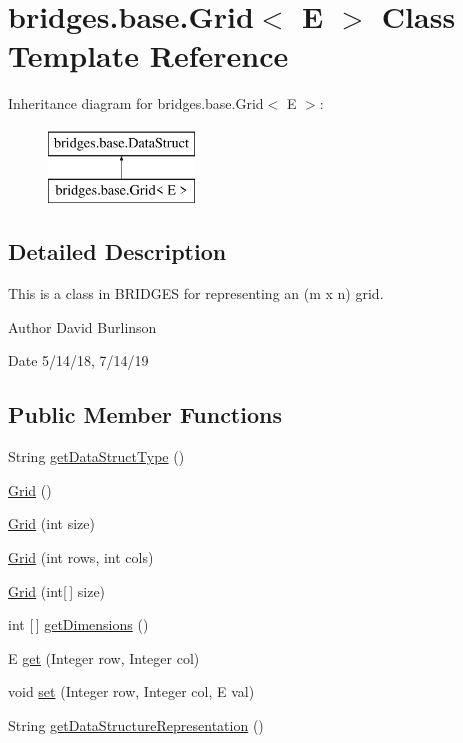\hypertarget{classbridges_1_1base_1_1_grid}{}\section{bridges.\+base.\+Grid$<$ E $>$ Class Template Reference}
\label{classbridges_1_1base_1_1_grid}
Inheritance diagram for bridges.\+base.\+Grid$<$ E $>$\+:\begin{figure}[H]
\begin{center}
\leavevmode
\includegraphics[height=2.000000cm]{classbridges_1_1base_1_1_grid}
\end{center}
\end{figure}


\subsection{Detailed Description}
This is a class in B\+R\+I\+D\+G\+ES for representing an (m x n) grid. 

\begin{DoxyAuthor}{Author}
David Burlinson 
\end{DoxyAuthor}
\begin{DoxyDate}{Date}
5/14/18, 7/14/19 
\end{DoxyDate}
\subsection*{Public Member Functions}
\begin{DoxyCompactItemize}
\item 
String \mbox{\hyperlink{classbridges_1_1base_1_1_grid_a81f268dd27c292ff2af9358039d4ebe6}{get\+Data\+Struct\+Type}} ()
\item 
\mbox{\hyperlink{classbridges_1_1base_1_1_grid_aa621ffc958db8341f7ce37ed78944d51}{Grid}} ()
\item 
\mbox{\hyperlink{classbridges_1_1base_1_1_grid_a9818d4959813f1292c6a234bc6f6aa9e}{Grid}} (int size)
\item 
\mbox{\hyperlink{classbridges_1_1base_1_1_grid_a43a699bd7ae2c6c986f978c515ff97d8}{Grid}} (int rows, int cols)
\item 
\mbox{\hyperlink{classbridges_1_1base_1_1_grid_ab9975b28d8dda7f3fbe0e35a7a026772}{Grid}} (int\mbox{[}$\,$\mbox{]} size)
\item 
int \mbox{[}$\,$\mbox{]} \mbox{\hyperlink{classbridges_1_1base_1_1_grid_aee8a5b66095d65ff067a4e76f2611b0e}{get\+Dimensions}} ()
\item 
E \mbox{\hyperlink{classbridges_1_1base_1_1_grid_a698579bb5b7166f76a18a1b04916e090}{get}} (Integer row, Integer col)
\item 
void \mbox{\hyperlink{classbridges_1_1base_1_1_grid_ab79ceb737423bb28ea2348e61a625a17}{set}} (Integer row, Integer col, E val)
\item 
String \mbox{\hyperlink{classbridges_1_1base_1_1_grid_a9a7faf2bbabae8d2f2babe9e29deb2c8}{get\+Data\+Structure\+Representation}} ()
\end{DoxyCompactItemize}
